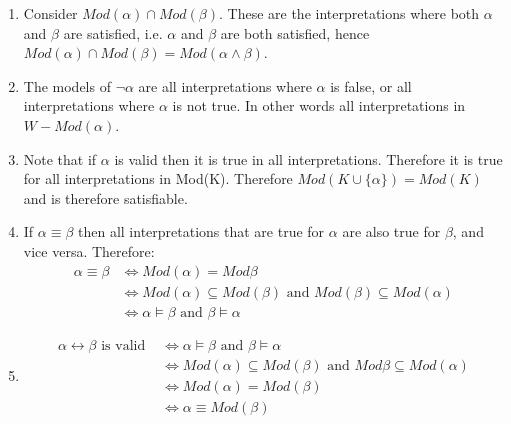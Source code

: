 \begin{enumerate}
    \item Consider $Mod(\alpha) \cap Mod(\beta)$. These are the interpretations where both $\alpha$ and $\beta$ are satisfied, i.e. $\alpha$ and $\beta$ are both satisfied, hence $ Mod(\alpha) \cap Mod(\beta) = Mod(\alpha \wedge \beta)$.

    \item The models of $\neg \alpha$ are all interpretations where $\alpha$ is false, or all interpretations where $\alpha$ is not true. In other words all interpretations in $W - Mod(\alpha)$.

    \item Note that if $\alpha$ is valid then it is true in all interpretations. Therefore it is true for all interpretations in Mod(K). Therefore $Mod(K \cup \{\alpha\}) = Mod(K)$ and is therefore satisfiable.

    \item If $\alpha \equiv \beta$ then all interpretations that are true for $\alpha$ are also true for $\beta$, and vice versa. Therefore:
    \begin{align*}
        \alpha \equiv \beta &\Leftrightarrow Mod(\alpha) = Mod{\beta}\\
        &\Leftrightarrow Mod(\alpha) \subseteq Mod(\beta) \text{ and } Mod(\beta) \subseteq Mod(\alpha)\\
        &\Leftrightarrow \alpha \models \beta \text{ and } \beta \models \alpha
    \end{align*}

    \item 
    \begin{align*}
        \alpha \leftrightarrow \beta \text{ is valid } &\Leftrightarrow \alpha \models \beta \text{ and } \beta \models \alpha\\
        &\Leftrightarrow Mod(\alpha) \subseteq Mod(\beta) \text{ and } Mod{\beta} \subseteq Mod(\alpha)\\
        &\Leftrightarrow Mod(\alpha) = Mod(\beta)\\
        &\Leftrightarrow \alpha \equiv Mod(\beta)
    \end{align*}
\end{enumerate}